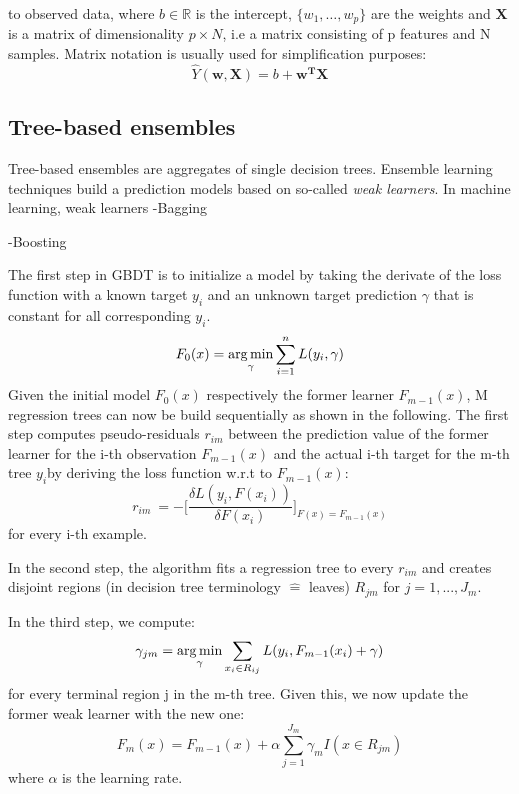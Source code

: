 to observed data, where $b \in \mathbb{R}$ is the intercept, $\{w_1, \dots, w_p\}$ are the weights and $\mathbf{X}$ is a matrix of dimensionality $p \times N$, i.e a matrix consisting of p features and N samples. Matrix notation is usually used for simplification purposes: 
\begin{equation}
	\hat Y(\mathbf{w},\mathbf{X}) = b + \mathbf{w^T}\mathbf{X}
\end{equation}

\subsection{Tree-based ensembles}

Tree-based ensembles are aggregates of single decision trees.  
Ensemble learning techniques build a prediction models based on so-called \textit{weak learners}. In machine learning, weak learners
-Bagging


-Boosting

The first step in GBDT is to initialize a model by taking the derivate of the loss function with a known target $ y_i $ and an unknown target prediction $ \gamma $ that is constant for all corresponding $ y_i $.
\begin{equation}
F_{0}(x) =  \operatorname*{arg\,min}_{\gamma} \sum_{i=1}^n L(y_i,\gamma) \label{gbdt_step1}
\end{equation}
Given the initial model $ F_0(x) $ respectively the former learner $ F_{m-1}(x) $, M regression trees can now be build sequentially as shown in the following. 
The first step computes pseudo-residuals $ r_{im} $ between the prediction value of the former learner for the i-th observation $ F_{m-1}(x) $ and the actual i-th target for the m-th tree $ y_i $by deriving the loss function w.r.t to $ F_{m-1}(x) $: 
\begin{equation}
	r_{im}\ = - \bigg[\dfrac{\delta L(y_i, F(x_i))}{\delta F(x_i)}\bigg]_{F(x) = F_{m-1}(x)}
\end{equation} 
for every i-th example.

In the second step, the algorithm fits a regression tree to every $ r_{im} $ and creates disjoint regions (in decision tree terminology $\widehat{=}$ \glqq leaves\grqq) $ R_{jm} $ for $j = 1, ..., J_m$. 

In the third step, we compute: 
\begin{equation}
	\gamma_{jm} = \operatorname*{arg\,min}_{\gamma} \sum_{x_i \in R_{ij}} L(y_i, F_{m-1}(x_i) + \gamma)
\end{equation}
for every terminal region j in the m-th tree. 
Given this, we now update the former weak learner with the new one:
\begin{equation}
	F_m(x) = F_{m-1}(x) + \alpha \sum_{j=1}^{J_m} \gamma_{m}I(x \in R_{jm})
\end{equation}
where $ \alpha $ is the learning rate.

